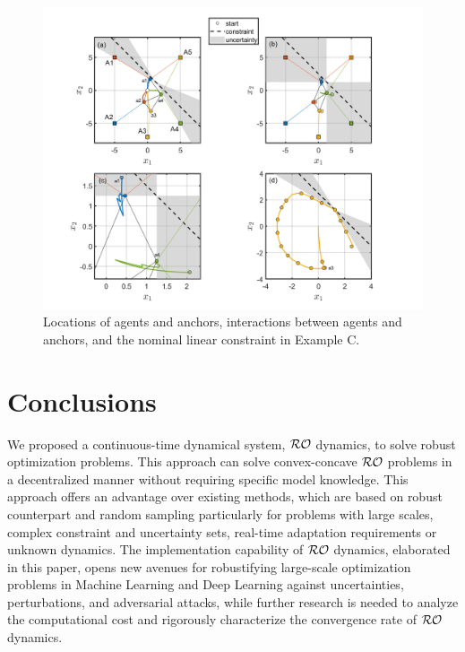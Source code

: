 \documentclass[journal,twoside,web]{ieeecolor}
\begin{document}
\begin{figure}
\begin{center}
\includegraphics[scale=0.26]{simulation_figure_finalv3.png}
\vspace{-1.5mm}
\caption{Locations of agents and anchors, interactions between agents and anchors, and the nominal linear constraint in Example C.}
\label{fig_points}
\end{center}
\end{figure}

\section{Conclusions}\label{section_conclusions}
We proposed a continuous-time dynamical system, ${\cal RO}$ dynamics, to solve robust optimization problems. This approach can solve convex-concave ${\cal RO}$ problems in a decentralized manner without requiring specific model knowledge. This approach offers an advantage over existing methods, which are based on robust counterpart and random sampling particularly for problems with large scales, complex constraint and uncertainty sets, real-time adaptation requirements or unknown dynamics. The implementation capability of ${\cal RO}$ dynamics, elaborated in this paper, opens new avenues for robustifying large-scale optimization problems in Machine Learning and Deep Learning against uncertainties, perturbations, and adversarial attacks, while further research is needed to analyze the computational cost and rigorously characterize the convergence rate of ${\cal RO}$ dynamics.
\end{document}
